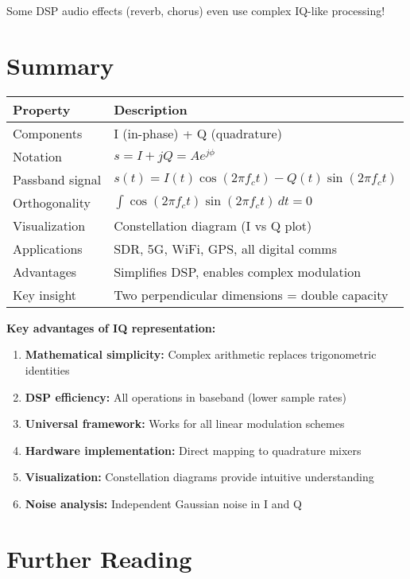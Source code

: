 Some DSP audio effects (reverb, chorus) even use complex IQ-like processing!

\section{Summary}

\begin{center}
\begin{tabular}{@{}ll@{}}
\toprule
\textbf{Property} & \textbf{Description} \\
\midrule
Components & I (in-phase) + Q (quadrature) \\
Notation & $s = I + jQ = Ae^{j\phi}$ \\
Passband signal & $s(t) = I(t)\cos(2\pi f_c t) - Q(t)\sin(2\pi f_c t)$ \\
Orthogonality & $\int \cos(2\pi f_c t) \sin(2\pi f_c t) \, dt = 0$ \\
Visualization & Constellation diagram (I vs Q plot) \\
Applications & SDR, 5G, WiFi, GPS, all digital comms \\
Advantages & Simplifies DSP, enables complex modulation \\
Key insight & Two perpendicular dimensions = double capacity \\
\bottomrule
\end{tabular}
\end{center}

\textbf{Key advantages of IQ representation:}

\begin{enumerate}
\item \textbf{Mathematical simplicity:} Complex arithmetic replaces trigonometric identities
\item \textbf{DSP efficiency:} All operations in baseband (lower sample rates)
\item \textbf{Universal framework:} Works for all linear modulation schemes
\item \textbf{Hardware implementation:} Direct mapping to quadrature mixers
\item \textbf{Visualization:} Constellation diagrams provide intuitive understanding
\item \textbf{Noise analysis:} Independent Gaussian noise in I and Q
\end{enumerate}

\section{Further Reading}

